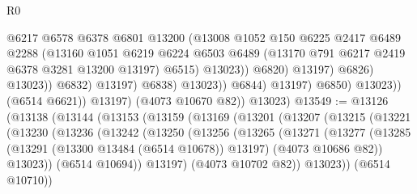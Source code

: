\begin{lexlean}{R0}
\begin{coremodule}
                                            @6217
                                            @6578
                                            @6378
                                            @6801
                                            @13200
                                            (@13008
                                              @1052
                                              @150
                                              @6225
                                              @2417
                                              @6489
                                              @2288
                                              (@13160
                                                @1051
                                                @6219
                                                @6224
                                                @6503
                                                @6489
                                                (@13170 @791 @6217 @2419 @6378 @3281 @13200 @13197)
                                                @6515)
                                              @13023))
                                          @6820)
                                        @13197)
                                      @6826)
                                    @13023))
                                @6832)
                              @13197)
                            @6838)
                          @13023))
                      @6844)
                    @13197)
                  @6850)
                @13023))
            (@6514 @6621))
          @13197)
        (@4073 @10670 @82))
      @13023)
@13549 := @13126
    (@13138
      (@13144
        (@13153
          (@13159
            (@13169
              (@13201
                (@13207
                  (@13215
                    (@13221
                      (@13230
                        (@13236
                          (@13242
                            (@13250
                              (@13256
                                (@13265
                                  (@13271
                                    (@13277
                                      (@13285
                                        (@13291 (@13300 @13484 (@6514 @10678)) @13197)
                                        (@4073 @10686 @82))
                                      @13023))
                                  (@6514 @10694))
                                @13197)
                              (@4073 @10702 @82))
                            @13023))
                        (@6514 @10710))

\end{coremodule}
\end{lexlean}
